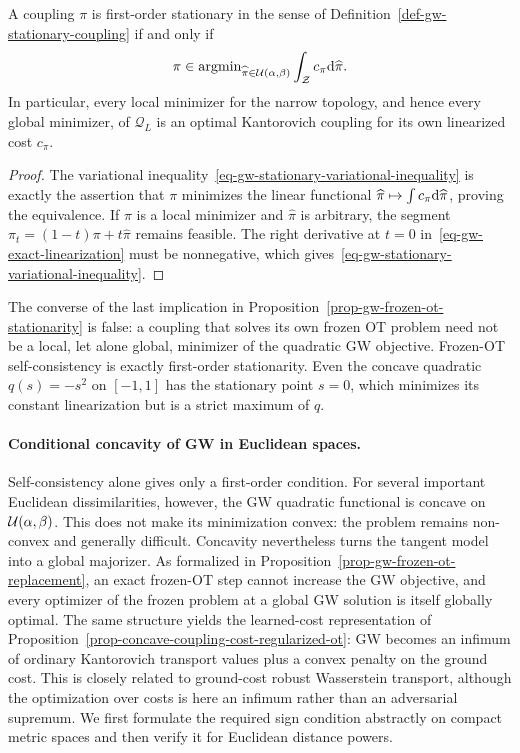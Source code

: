 \begin{prop}\label{prop-gw-frozen-ot-stationarity}
	A coupling $\pi$ is first-order stationary in the sense of Definition~\ref{def-gw-stationary-coupling} if and only if
	\begin{equation}\label{eq-gw-frozen-ot-fixed-point}
		\pi\in\operatorname{argmin}_{\widehat\pi\in\mathcal{U}(\alpha,\beta)}
		\int_{\mathcal Z}c_\pi\mathrm{d}\widehat\pi.
	\end{equation}
	In particular, every local minimizer for the narrow topology, and hence every global minimizer, of $\mathcal Q_L$ is an optimal Kantorovich coupling for its own linearized cost $c_\pi$.
\end{prop}
\begin{proof}
	The variational inequality~\eqref{eq-gw-stationary-variational-inequality} is exactly the assertion that $\pi$ minimizes the linear functional $\widehat\pi\mapsto\int c_\pi\mathrm{d}\widehat\pi$, proving the equivalence. If $\pi$ is a local minimizer and $\widehat\pi$ is arbitrary, the segment $\pi_t=(1-t)\pi+t\widehat\pi$ remains feasible. The right derivative at $t=0$ in~\eqref{eq-gw-exact-linearization} must be nonnegative, which gives~\eqref{eq-gw-stationary-variational-inequality}.
\end{proof}

The converse of the last implication in Proposition~\ref{prop-gw-frozen-ot-stationarity} is false: a coupling that solves its own frozen OT problem need not be a local, let alone global, minimizer of the quadratic GW objective. Frozen-OT self-consistency is exactly first-order stationarity. Even the concave quadratic $q(s)=-s^2$ on $[-1,1]$ has the stationary point $s=0$, which minimizes its constant linearization but is a strict maximum of $q$.

\paragraph{Conditional concavity of GW in Euclidean spaces.}
Self-consistency alone gives only a first-order condition. For several important Euclidean dissimilarities, however, the GW quadratic functional is concave on $\mathcal{U}(\alpha,\beta)$. This does not make its minimization convex: the problem remains non-convex and generally difficult. Concavity nevertheless turns the tangent model into a global majorizer. As formalized in Proposition~\ref{prop-gw-frozen-ot-replacement}, an exact frozen-OT step cannot increase the GW objective, and every optimizer of the frozen problem at a global GW solution is itself globally optimal. The same structure yields the learned-cost representation of Proposition~\ref{prop-concave-coupling-cost-regularized-ot}: GW becomes an infimum of ordinary Kantorovich transport values plus a convex penalty on the ground cost. This is closely related to ground-cost robust Wasserstein transport, although the optimization over costs is here an infimum rather than an adversarial supremum. We first formulate the required sign condition abstractly on compact metric spaces and then verify it for Euclidean distance powers.

